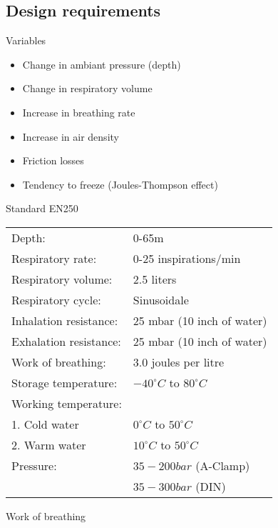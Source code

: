 \documentclass[aspectratio=1610,english,12pt]{beamer}
\begin{document}
\subsection{Design requirements}

\begin{frame}{Variables}
	\begin{itemize}
		\item Change in ambiant pressure (depth)
		\item Change in respiratory volume
		\item Increase in breathing rate
		\item Increase in air density
		\item Friction losses
		\item Tendency to freeze (Joules-Thompson effect)
	\end{itemize}
\end{frame}

\begin{frame}{Standard EN250}
	\begin{tabular}{l l}
		Depth: 				& 0-65m\\
		Respiratory rate:			& 0-25 inspirations/min\\
		Respiratory volume:		& 2.5 liters\\
		Respiratory cycle:		& Sinusoidale\\
		Inhalation resistance:	& 25 mbar (10 inch of water)\\
		Exhalation resistance:	& 25 mbar (10 inch of water)\\
		Work of breathing:		& 3.0 joules per litre\\
		Storage temperature:		& $-40^{\circ}C$ to $80^{\circ}C$ \\
		Working temperature:		&\\
		1. Cold water 				& $0^{\circ}C$ to $50^{\circ}C$\\
		2. Warm water				& $10^{\circ}C$ to $50^{\circ}C$\\
		Pressure:					& $35-200 bar$ (A-Clamp)\\
										& $35-300 bar$ (DIN)
	\end{tabular}
\end{frame}

\begin{frame}{Work of breathing}
\end{frame}
\end{document}
